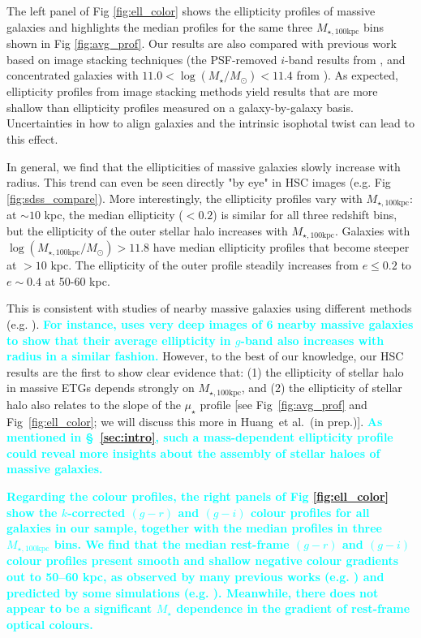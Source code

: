 \documentclass[fleqn,usenatbib]{mnras}
\def\etal{{\ et al.~}}
\def\mstar{{$M_{\star}$}}
\def\logms{{$\log (M_{\star}/M_{\odot})$}}
\def\mtot{{$M_{\star,100\mathrm{kpc}}$}}
\def\logmtot{{$\log (M_{\star,100\mathrm{kpc}}/M_{\odot})$}}
\def\mden{{$\mu_{\star}$}}
\newcommand{\song}[1]{\textcolor{cyan}{\textbf{#1}}}
\begin{document}
	The left panel of Fig \ref{fig:ell_color} shows the ellipticity profiles of 
	massive galaxies and highlights the median profiles for the same three \mtot{} 
	bins shown in Fig \ref{fig:avg_prof}.  
	Our results are also compared with previous work based on image stacking 
	techniques (the PSF-removed $i$-band results from \citealt{Tal2011}, and
    concentrated galaxies with $11.0<$\logms{}$<11.4$ from \citealt{dSouza2015}).
	As expected, ellipticity profiles from image stacking methods yield results that 
	are more shallow than ellipticity profiles measured on a galaxy-by-galaxy basis.     
	Uncertainties in how to align galaxies and the intrinsic isophotal twist can 
	lead to this effect. 

	In general, we find that the ellipticities of massive galaxies slowly increase 
	with radius. 
	This trend can even be seen directly "by eye" in HSC images (e.g. 
	Fig \ref{fig:sdss_compare}). 
	More interestingly, the ellipticity profiles vary with \mtot{}: 
	at ${\sim} 10$ kpc, the median ellipticity ($< 0.2$) is similar for all three 
	redshift bins, but the ellipticity of the outer stellar halo increases with 
	\mtot{}. 
	Galaxies with \logmtot{}$>11.8$ have median ellipticity profiles that become 
	steeper at $>10$ kpc. 
	The ellipticity of the outer profile steadily increases from 
	$e\le 0.2$ to $e{\sim} 0.4$ at 50-60 kpc.
    
	This is consistent with studies of nearby massive galaxies using different
	methods (e.g. \citep{Porter1991, Gonzalez2005, Zibetti2005, Huang2013a, Oh2017}). 
	\song{
	For instance, \citet{Spavone2017} uses very deep images of 6 nearby massive 
	galaxies to show that their average ellipticity in $g$-band also increases with 
	radius in a similar fashion.
	}
	However, to the best of our knowledge, our HSC results are the first to show 
	clear evidence that:  
	(1) the ellipticity of stellar halo in massive ETGs depends strongly on 
	\mtot{}, and 
	(2) the ellipticity of stellar halo also relates to the slope of the \mden{}
	profile [see Fig~\ref{fig:avg_prof} and Fig~\ref{fig:ell_color}; 
	we will discuss this more in Huang\etal (in prep.)]. 
	\song{
	As mentioned in \S~\ref{sec:intro}, such a mass-dependent ellipticity profile
	could reveal more insights about the assembly of stellar haloes of massive
	galaxies. 
	}
    
    \song{
    Regarding the colour profiles, the right panels of Fig \ref{fig:ell_color} show 
    the $k$-corrected $(g-r)$ and $(g-i)$ colour profiles for all galaxies in our 
    sample, together with the median profiles in three \mtot{} bins. 
    We find that the median rest-frame $(g-r)$ and $(g-i)$ colour profiles present 
    smooth and shallow negative colour gradients out to 50--60 kpc, as observed by 
    many previous works (e.g. \citealt{Carollo1993, LaBarbera2012}) and predicted 
    by some simulations (e.g. \citealt{Hirschmann2015}). 
    Meanwhile, there does not appear to be a significant \mstar{} dependence 
    in the gradient of rest-frame optical colours. 
    }
    
\end{document}
